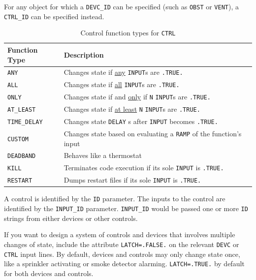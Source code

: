 \documentclass[11pt]{book}
\newcommand{\ct}{\tt\small}
\begin{document}
For any object for which a {\ct DEVC\_ID} can be specified (such as {\ct OBST} or {\ct VENT}), a {\ct CTRL\_ID} can be
specified instead.
\begin{table}[h!]
\caption{Control function types for {\ct CTRL}}
\label{tab:funcvalues}
\begin{center}
\begin{tabular}{|l||l|}
\hline
Function Type                     & Description   \\ \hline \hline
{\ct ANY}                         & Changes state if \underline{any} {\ct INPUT}s are {\ct .TRUE.}     \\ \hline
{\ct ALL}                         & Changes state if \underline{all} {\ct INPUT}s are {\ct .TRUE.}  \\ \hline
{\ct ONLY}                        & Changes state if and \underline{only} if {\ct N} {\ct INPUT}s are {\ct .TRUE.}     \\ \hline
{\ct AT\_LEAST}                   & Changes state if \underline{at least} {\ct N} {\ct INPUT}s are {\ct .TRUE.}     \\ \hline \hline
{\ct TIME\_DELAY}                 & Changes state {\ct DELAY} s after {\ct INPUT} becomes {\ct .TRUE.}      \\ \hline
{\ct CUSTOM}                      & Changes state based on evaluating a {\ct RAMP} of the function's input     \\ \hline
{\ct DEADBAND}                    & Behaves like a thermostat     \\ \hline
{\ct KILL}                        & Terminates code execution if its sole {\ct INPUT} is {\ct .TRUE.}  \\ \hline
{\ct RESTART}                     & Dumps restart files if its sole {\ct INPUT} is {\ct .TRUE.} \\ \hline
\end{tabular}
\end{center}
\end{table}
A control is identified by the {\ct ID} parameter.  The inputs to the control are identified
by the {\ct INPUT\_ID} parameter.  {\ct INPUT\_ID} would be passed one or more {\ct ID} strings
from either devices or other controls.


If you want to design a system of controls and devices that involves multiple changes of state,
include the attribute {\ct LATCH=.FALSE.} on the relevant {\ct DEVC} or {\ct CTRL} input lines.
By default, devices and controls may only change state once, like a sprinkler activating or
smoke detector alarming. {\ct LATCH=.TRUE.} by default for both devices and controls.
\end{document}
